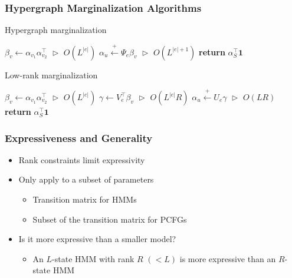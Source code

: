 \documentclass{beamer}
\begin{document}
\begin{frame}
\frametitle{Hypergraph Marginalization Algorithms}
\centering
\begin{algorithm}[H]
\caption{\label{alg:hypergraph-marg} Hypergraph marginalization}
\begin{algorithmic} 
\STATE $\beta_v \gets \alpha_{v_1}\alpha_{v_2}^\top$
    \hfill $\vartriangleright$ $O(L^{|e|})$
\STATE $\alpha_u \stackrel{+}{\gets} \Psi_e\beta_v$
    \hfill $\vartriangleright$ $O(L^{|e|+1})$
\ENDFOR
\STATE \textbf{return} $\alpha_S^\top \mathbf{1}$
\end{algorithmic}

\end{algorithm}

\begin{algorithm}[H]
\caption{\label{alg:low-rank-update} Low-rank marginalization}
\begin{algorithmic} 
\STATE $\beta_v \gets \alpha_{v_1}\alpha_{v_2}^\top$
    \hfill $\vartriangleright$ $O(L^{|e|})$
\STATE $\gamma \gets V_e^\top\beta_v$
    \hfill $\vartriangleright$ $O(L^{|e|}R)$
\STATE $\alpha_u \stackrel{+}{\gets} U_e\gamma $
    \hfill $\vartriangleright$ $O(LR)$
\ENDFOR
\STATE \textbf{return} $\alpha_S^\top\mathbf{1}$
\end{algorithmic} 
\end{algorithm}

\end{frame}


\begin{frame}
\frametitle{Expressiveness and Generality}
\begin{itemize}
\item Rank constraints limit expressivity
\vspace{1em}
\item Only apply to a subset of parameters
    \begin{itemize}
    \item Transition matrix for HMMs
    \item Subset of the transition matrix for PCFGs
    \end{itemize}
\vspace{1em}
\item Is it more expressive than a smaller model?
    \begin{itemize}
    \item An $L$-state HMM with rank $R$ $(< L)$ is more
        expressive than an $R$-state HMM
    \end{itemize}
\end{itemize}
\end{frame}
\end{document}
